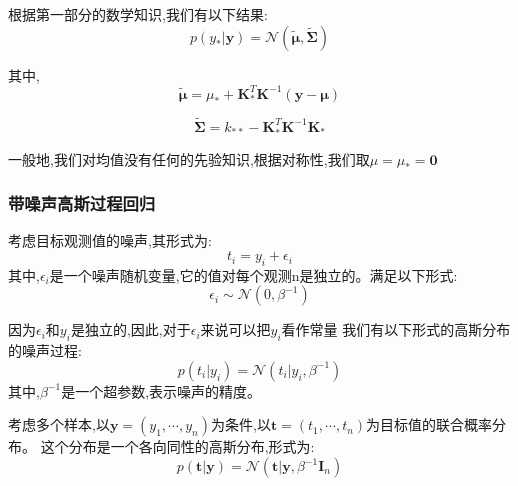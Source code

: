\documentclass[UTF8,a4paper]{ctexart}
\begin{document}
            根据第一部分的数学知识,我们有以下结果:
            \begin{equation}
                p(y_* | \bm y)  = \mathcal{N}( \bm \tilde \mu ,  \bm  \tilde \Sigma)
            \end{equation}

            其中,
            \begin{equation}
                \bm \tilde \mu = \mu_* + \bm K_*^T\bm K^{-1}(\bm y - \bm \mu)
            \end{equation}

            \begin{equation}
                 \bm \tilde \Sigma = k_{**} - \bm K_*^T\bm K^{-1}\bm K_*
            \end{equation}

            {\color{blue}一般地,我们对均值没有任何的先验知识,根据对称性,我们取$\mu = \mu_* = \bm 0$}

            \subsubsection{带噪声高斯过程回归}
            考虑目标观测值的噪声,其形式为:
            \begin{equation}
                t_i = y_i + \epsilon_i
            \end{equation}
            其中,$\epsilon_i$是一个噪声随机变量,它的值对每个观测n是独立的。满足以下形式:
            \begin{equation}
                \epsilon_i \sim \mathcal{N}(0 , \beta^{-1})
            \end{equation}

            {\color{blue}因为$\epsilon_i$和$y_i$是独立的,因此,对于$\epsilon_i$来说可以把$y_i$看作常量}
            我们有以下形式的高斯分布的噪声过程:
            \begin{equation}
                p(t_i|y_i) = \mathcal{N}(t_i | y_i , \beta^{-1})
            \end{equation}
            其中,$\beta^{-1}$是一个超参数,表示噪声的精度。

            考虑多个样本,以$\bm y = (y_1 , \cdots , y_n)$为条件,以$\bm t = (t_1, \cdots , t_n)$为目标值的联合概率分布。
            这个分布是一个各向同性的高斯分布,形式为:
            \begin{equation}
                p(\bm t|\bm y) = \mathcal N(\bm t | \bm y , \beta^{-1}\bm I_n)
            \end{equation}
\end{document}
